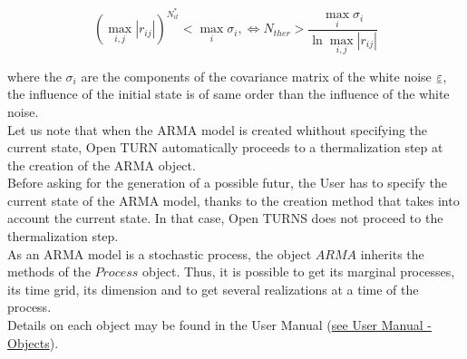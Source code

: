 \begin{equation}\label{nitEt}
  \left( \max_{i,j} |r_{ij}| \right)^{N_{it}^*} <  \max_{i} \sigma_i, \Longleftrightarrow N_{ther} > \displaystyle \frac{\max_{i} \sigma_i}{\ln \max_{i,j} |r_{ij}|}
\end{equation}

where the $\sigma_i$ are the components of the covariance matrix of the white noise ${\underline{\varepsilon}}$,  the influence of the initial state is of same order than the influence of the white noise.\\


Let us note that when the ARMA model is created whithout specifying the current state, Open TURN automatically proceeds to a  thermalization step at the creation of the ARMA object. \\
Before asking for the generation of a possible futur, the User has to specify the current state of the ARMA model, thanks to the creation method that takes into account the current state. In that case, Open TURNS does not proceed to the thermalization step.\\

As an ARMA model is a stochastic process, the object $ARMA$ inherits the methods of the $Process$ object. Thus, it is possible to get its marginal processes, its time grid, its dimension and to get several realizations at a time of the process.\\


Details on each object may be found in the User Manual  (\href{OpenTURNS_UserManual_TUI.pdf}{see User Manual - Objects}).\\

